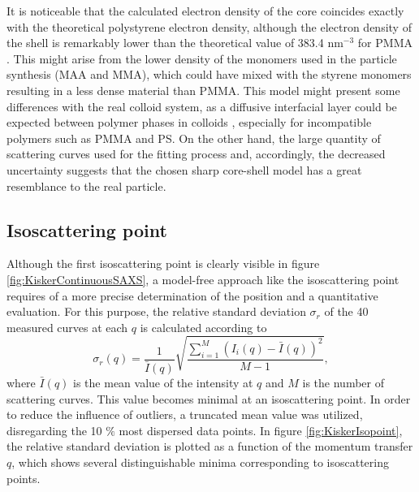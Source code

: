 It is noticeable that the calculated electron density of the core coincides exactly with the theoretical polystyrene electron density, although the electron density of the shell is remarkably lower than the theoretical value of 383.4 nm\(^{-3}\) for PMMA \citep{ballauff_saxs_2001-1}. This might arise from the lower density of the monomers used in the particle synthesis (MAA and MMA), which could have mixed with the styrene monomers resulting in a less dense material than PMMA. This model might present some differences with the real colloid system, as a diffusive interfacial layer could be expected between polymer phases in colloids \citep{dingenouts_interface_1994}, especially for incompatible polymers such as PMMA and PS. On the other hand, the large quantity of scattering curves used for the fitting process and, accordingly, the decreased uncertainty suggests that the chosen sharp core-shell model has a great resemblance to the real particle.

\subsection{Isoscattering point}

Although the first isoscattering point is clearly visible in figure \ref{fig:KiskerContinuousSAXS}, a model-free approach like the isoscattering point requires of a more precise determination of the position and a quantitative evaluation. For this purpose, the relative standard deviation $\sigma_r$ of the 40 measured curves at each \(q\) is calculated according to
\begin{equation}
\sigma_r (q)=\frac{1}{\bar{I}(q)}\sqrt{\frac{\sum^{M}_{i=1} (I_i(q) -\bar{I} (q))^2 }{M-1}} ,
\end{equation}
where \(\bar{I} (q)\) is the mean value of the intensity at \(q\) and \( M \) is the number of scattering curves. This value becomes minimal at an isoscattering point. In order to reduce the influence of outliers, a truncated mean value was utilized, disregarding the 10 $\%$ most dispersed data points. In figure \ref{fig:KiskerIsopoint}, the relative standard deviation is plotted as a function of the momentum transfer \(q\), which shows several distinguishable minima corresponding to isoscattering points.

%		


